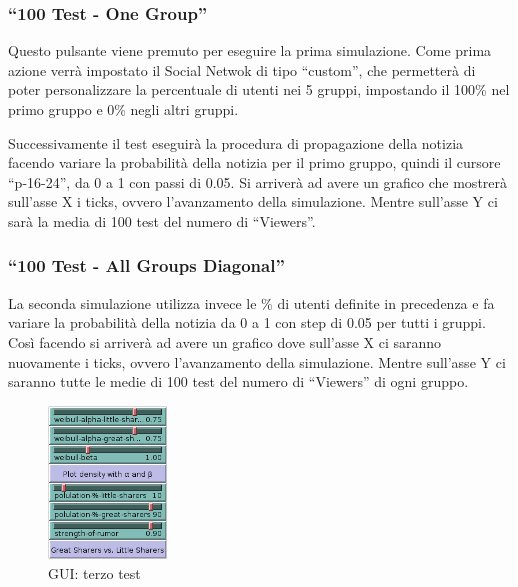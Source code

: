 \subsubsection{``100 Test - One Group''}
Questo pulsante viene premuto per eseguire la prima simulazione. 
Come prima azione verrà impostato il Social Netwok di tipo ``custom'', che permetterà di poter personalizzare
la percentuale di utenti nei 5 gruppi, impostando il 100\% nel primo gruppo e 0\% negli altri gruppi. 

Successivamente il test eseguirà la procedura di propagazione della notizia facendo variare la probabilità 
della notizia per il primo gruppo, quindi il cursore ``p-16-24'', da 0 a 1 con passi di 0.05.
Si arriverà ad avere un grafico che mostrerà sull'asse X i ticks, ovvero l'avanzamento della simulazione. 
Mentre sull'asse Y ci sarà la media di 100 test del numero di ``Viewers''.

\subsubsection{``100 Test - All Groups Diagonal''}
La seconda simulazione utilizza invece le \% di utenti definite in precedenza e fa variare la probabilità 
della notizia da 0 a 1 con step di 0.05 per tutti i gruppi.
Così facendo si arriverà ad avere un grafico dove sull'asse X ci saranno nuovamente i ticks, ovvero l'avanzamento della simulazione.
Mentre sull'asse Y ci saranno tutte le medie di 100 test del numero di ``Viewers'' di ogni gruppo.

\begin{figure}
  \vspace*{-20pt}
  \begin{center}
    \includegraphics[width=0.28\textwidth]{img/gui-third-test.png}
  \end{center}
 \vspace*{-10pt}
 \caption{GUI: 
 terzo test}
 \vspace*{-10pt}
 \label{img:gui_third_test}
\end{figure}



